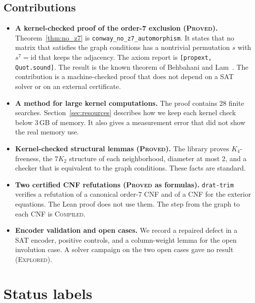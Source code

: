 \documentclass[pdflatex,sn-mathphys-num]{sn-jnl}
\theoremstyle{thmstyleone}
\theoremstyle{thmstyletwo}
\theoremstyle{thmstylethree}
\numberwithin{equation}{section}
\begin{document}
\subsection{Contributions}

\begin{itemize}
 \item \textbf{A kernel-checked proof of the order-7 exclusion (\textsc{Proved}).} Theorem~\ref{thm:no_z7} is \texttt{conway\_no\_z7\_automorphism}. It states that no matrix that satisfies the graph conditions has a nontrivial permutation $s$ with $s^7 = \mathrm{id}$ that keeps the adjacency. The axiom report is \texttt{[propext, Quot.sound]}. The result is the known theorem of Behbahani and Lam~\cite{behbahani2011strongly}. The contribution is a machine-checked proof that does not depend on a SAT solver or on an external certificate.
 \item \textbf{A method for large kernel computations.} The proof contains 28 finite searches. Section~\ref{sec:resources} describes how we keep each kernel check below 3\,GB of memory. It also gives a measurement error that did not show the real memory use.
 \item \textbf{Kernel-checked structural lemmas (\textsc{Proved}).} The library proves $K_4$-freeness, the $7K_2$ structure of each neighborhood, diameter at most 2, and a checker that is equivalent to the graph conditions. These facts are standard.
 \item \textbf{Two certified CNF refutations (\textsc{Proved} as formulas).} \texttt{drat-trim} verifies a refutation of a canonical order-7 CNF and of a CNF for the exterior equations. The Lean proof does not use them. The step from the graph to each CNF is \textsc{Compiled}.
 \item \textbf{Encoder validation and open cases.} We record a repaired defect in a SAT encoder, positive controls, and a column-weight lemma for the open involution case. A solver campaign on the two open cases gave no result (\textsc{Explored}).
\end{itemize}

\section{Status labels}
\label{sec:taxonomy}
\end{document}
